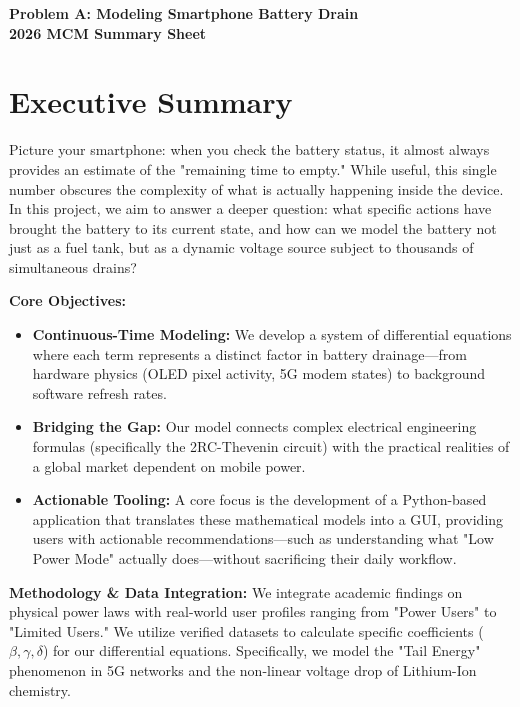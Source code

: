 \documentclass[12pt]{article}
\newcommand{\Problem}{A}
\begin{document}
\thispagestyle{empty}
\begin{center}
\textbf{\Large Problem \Problem: Modeling Smartphone Battery Drain} \\[1em]
\textbf{2026 MCM Summary Sheet} \\[2em]
\end{center}

\section*{Executive Summary}

Picture your smartphone: when you check the battery status, it almost always provides an estimate of the "remaining time to empty." While useful, this single number obscures the complexity of what is actually happening inside the device. In this project, we aim to answer a deeper question: what specific actions have brought the battery to its current state, and how can we model the battery not just as a fuel tank, but as a dynamic voltage source subject to thousands of simultaneous drains?

\textbf{Core Objectives:}
\begin{itemize}
    \item \textbf{Continuous-Time Modeling:} We develop a system of differential equations where each term represents a distinct factor in battery drainage—from hardware physics (OLED pixel activity, 5G modem states) to background software refresh rates.
    \item \textbf{Bridging the Gap:} Our model connects complex electrical engineering formulas (specifically the 2RC-Thevenin circuit) with the practical realities of a global market dependent on mobile power.
    \item \textbf{Actionable Tooling:} A core focus is the development of a Python-based application that translates these mathematical models into a GUI, providing users with actionable recommendations—such as understanding what "Low Power Mode" actually does—without sacrificing their daily workflow.
\end{itemize}

\textbf{Methodology \& Data Integration:}
We integrate academic findings on physical power laws with real-world user profiles ranging from "Power Users" to "Limited Users." We utilize verified datasets to calculate specific coefficients ($\beta, \gamma, \delta$) for our differential equations. Specifically, we model the "Tail Energy" phenomenon in 5G networks and the non-linear voltage drop of Lithium-Ion chemistry.
\end{document}
